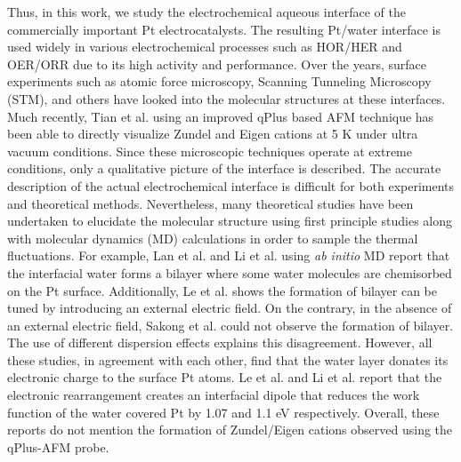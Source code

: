 Thus, in this work, we study the electrochemical aqueous interface of the commercially important Pt electrocatalysts. The resulting Pt/water interface is used widely in various electrochemical processes such as HOR/HER\cite{eftekhari2017electrocatalysts} and OER/ORR\cite{sui2017comprehensive} due to its high activity and performance. Over the years, surface experiments such as atomic force microscopy\cite{tian2022visualizing}, Scanning Tunneling Microscopy\cite{carrasco2012molecular} (STM), and others\cite{magnussen2019toward} have looked into the molecular structures at these interfaces. Much recently, Tian et al.\cite{tian2022visualizing} using an improved qPlus based AFM technique has been able to directly visualize Zundel and Eigen cations at 5 K under ultra vacuum conditions. Since these microscopic techniques operate at extreme conditions, only a qualitative picture of the interface is described. The accurate description of the actual electrochemical interface is difficult for both experiments and theoretical methods. Nevertheless, many theoretical studies have been undertaken to elucidate the molecular structure using first principle studies\cite{karlberg2007cyclic,karlberg2007cyclic,skulason2007density} along with molecular dynamics (MD) calculations\cite{li2021establishment,sakong2018electric,le2018structure,lan2020ionization} in order to sample the thermal fluctuations. For example, Lan et al.\cite{lan2020ionization} and Li et al.\cite{li2021establishment} using \textit{ab initio} MD report that the interfacial water forms a bilayer where some water molecules are chemisorbed on the Pt surface. Additionally, Le et al.\cite{le2018structure} shows the formation of bilayer can be tuned by introducing an external electric field. On the contrary, in the absence of an external electric field, Sakong et al.\cite{sakong2018electric} could not observe the formation of bilayer. The use of different dispersion effects explains this disagreement\cite{gross2022ab}.
However, all these studies, in agreement with each other, find that the water layer donates its electronic charge to the surface Pt atoms. Le et al.\cite{le2018structure} and Li et al.\cite{li2021establishment} report that the electronic rearrangement creates an interfacial dipole that reduces the work function of the water covered Pt by 1.07 and 1.1 eV respectively. Overall, these reports do not mention the formation of Zundel/Eigen cations observed using the qPlus-AFM\cite{tian2022visualizing} probe. 

